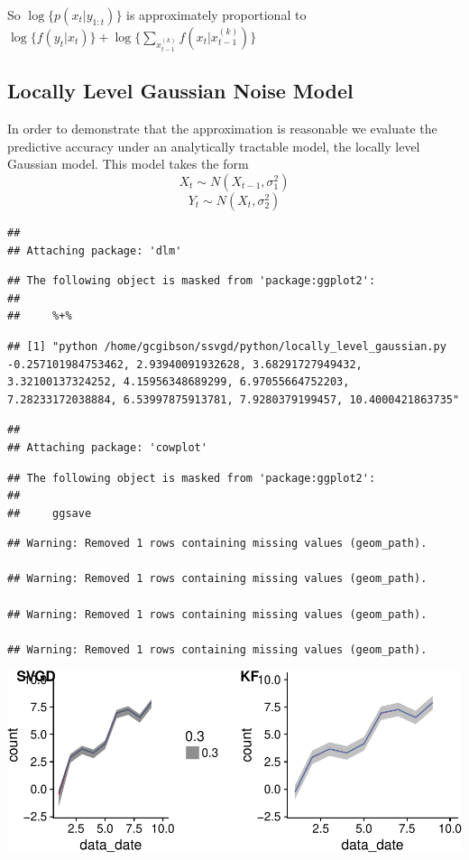 \documentclass[]{article}
\begin{document}
So \(\log\{p(x_{t} | y_{1:t})\}\) is approximately proportional to
\(\log\{f(y_t | x_t)\} + \log\{\sum_{x_{t-1}^{(k)}} f(x_t | x_{t - 1}^{(k)})\}\)

\subsection{Locally Level Gaussian Noise
Model}\label{locally-level-gaussian-noise-model}

In order to demonstrate that the approximation is reasonable we evaluate
the predictive accuracy under an analytically tractable model, the
locally level Gaussian model. This model takes the form
\[X_t \sim N(X_{t-1},\sigma_1^2)\] \[Y_t \sim N(X_t, \sigma_2^2)\]

\begin{verbatim}
## 
## Attaching package: 'dlm'
\end{verbatim}

\begin{verbatim}
## The following object is masked from 'package:ggplot2':
## 
##     %+%
\end{verbatim}

\begin{verbatim}
## [1] "python /home/gcgibson/ssvgd/python/locally_level_gaussian.py  -0.257101984753462, 2.93940091932628, 3.68291727949432, 3.32100137324252, 4.15956348689299, 6.97055664752203, 7.28233172038884, 6.53997875913781, 7.9280379199457, 10.4000421863735"
\end{verbatim}

\begin{verbatim}
## 
## Attaching package: 'cowplot'
\end{verbatim}

\begin{verbatim}
## The following object is masked from 'package:ggplot2':
## 
##     ggsave
\end{verbatim}

\begin{verbatim}
## Warning: Removed 1 rows containing missing values (geom_path).

## Warning: Removed 1 rows containing missing values (geom_path).

## Warning: Removed 1 rows containing missing values (geom_path).

## Warning: Removed 1 rows containing missing values (geom_path).
\end{verbatim}

\includegraphics{ssvgd_files/figure-latex/unnamed-chunk-2-1.pdf}
\end{document}

